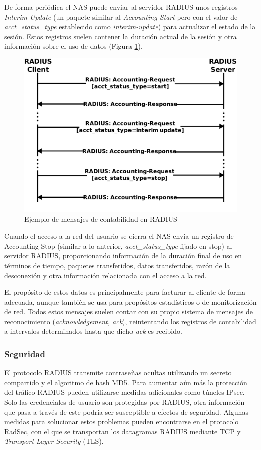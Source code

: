 De forma periódica el NAS puede enviar al servidor RADIUS unos registros \emph{Interim Update} (un paquete similar al \emph{Accounting Start} pero con el valor de \emph{acct\_status\_type} establecido como \emph{interim-update}) para actualizar el estado de la sesión. Estos registros suelen contener la duración actual de la sesión y otra información sobre el uso de datos (Figura \ref{RADIUSCont}).

\begin{figure}[!t]
\begin{center}
\includegraphics[width=0.75\linewidth]{./3_Tecnologias/Img/RADIUSCont.png}
\end{center}
\caption{Ejemplo de mensajes de contabilidad en RADIUS}
\label{RADIUSCont}
\end{figure}

Cuando el acceso a la red del usuario se cierra el NAS envía un registro de Accounting Stop (similar a lo anterior, \emph{acct\_status\_type} fijado en stop) al servidor RADIUS, proporcionando información de la duración final de uso en términos de tiempo, paquetes transferidos, datos transferidos, razón de la desconexión y otra información relacionada con el acceso a la red.

El propósito de estos datos es principalmente para facturar al cliente de forma adecuada, aunque también se usa para propósitos estadísticos o de monitorización de red. Todos estos mensajes suelen contar con su propio sistema de mensajes de reconocimiento (\emph{acknowledgement, ack}), reintentando los registros de contabilidad a intervalos determinados hasta que dicho \emph{ack} es recibido.

\subsubsection{Seguridad}
El protocolo RADIUS transmite contraseñas ocultas utilizando un secreto compartido y el algoritmo de hash MD5. Para aumentar aún más la protección del tráfico RADIUS pueden utilizarse medidas adicionales como túneles IPsec. Solo las credenciales de usuario son protegidas por RADIUS, otra información que pasa a través de este podría ser susceptible a efectos de seguridad. Algunas medidas para solucionar estos problemas pueden encontrarse en el protocolo RadSec, con el que se transportan los datagramas RADIUS mediante TCP y \emph{Transport Layer Security} (\acrshort{TLS}).

